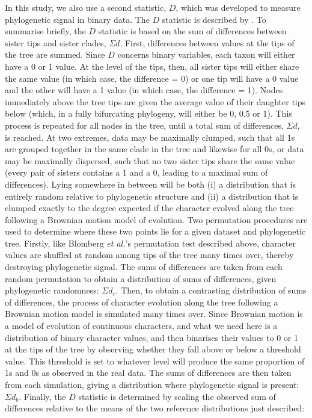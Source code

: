 In this study, we also use a second statistic, \(D\), which was developed to measure phylogenetic signal in binary data. The \(D\) statistic is described by \textcite{fritz_selectivity_2010}. To summarise briefly, the \(D\) statistic is based on the sum of differences between sister tips and sister clades, \(\Sigma d\). First, differences between values at the tips of the tree are summed. Since \(D\) concerns binary variables, each taxon will either have a 0 or 1 value. At the level of the tips, then, all sister tips will either share the same value (in which case, the difference = 0) or one tip will have a 0 value and the other will have a 1 value (in which case, the difference = 1). Nodes immediately above the tree tips are given the average value of their daughter tips below (which, in a fully bifurcating phylogeny, will either be 0, 0.5 or 1). This process is repeated for all nodes in the tree, until a total sum of differences, \(\Sigma d\), is reached. At two extremes, data may be maximally clumped, such that all 1s are grouped together in the same clade in the tree and likewise for all 0s, or data may be maximally dispersed, such that no two sister tips share the same value (every pair of sisters contains a 1 and a 0, leading to a maximal sum of differences). Lying somewhere in between will be both (i) a distribution that is entirely random relative to phylogenetic structure and (ii) a distribution that is clumped exactly to the degree expected if the character evolved along the tree following a Brownian motion model of evolution. Two permutation procedures are used to determine where these two points lie for a given dataset and phylogenetic tree. Firstly, like Blomberg \emph{et al.}'s permutation test described above, character values are shuffled at random among tips of the tree many times over, thereby destroying phylogenetic signal. The sums of differences are taken from each random permutation to obtain a distribution of sums of differences, given phylogenetic randomness: \(\Sigma d_r\). Then, to obtain a contrasting distribution of sums of differences, the process of character evolution along the tree following a Brownian motion model is simulated many times over. Since Brownian motion is a model of evolution of continuous characters, and what we need here is a distribution of binary character values, and then binarises their values to 0 or 1 at the tips of the tree by observing whether they fall above or below a threshold value. This threshold is set to whatever level will produce the same proportion of 1s and 0s as observed in the real data. The sums of differences are then taken from each simulation, giving a distribution where phylogenetic signal is present: \(\Sigma d_b\). Finally, the \(D\) statistic is determined by scaling the observed sum of differences relative to the means of the two reference distributions just described:

